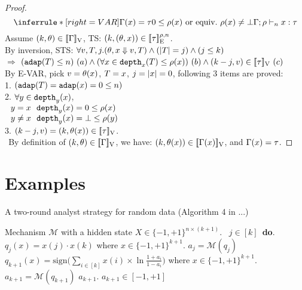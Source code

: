 \documentclass[a4paper,11pt]{article}
\theoremstyle{definition}
\begin{document}
\begin{proof}
\[    
	\inferrule*[right = VAR]{
      \Gamma(x) = \type \\ 0 \leq \dmap(x) \mbox{ or equiv.\ } \dmap(x) \neq \bot
    }{
      \Gamma; \dmap \tvdash{\nnatA} x: \type
    }
\]
Assume $(k, \theta) \in [\![ \Gamma ]\!]_{\text{V}}$, TS: $(k, (\theta, x)) \in [\![ \tau ]\!]_{\text{E}}^{\rho, n}$.\\
%
By inversion, STS: $\forall v, T, j. (\theta, x \mathrel{\Downarrow} v, T) \land (|T| = j) \land (j \leq k) $\\
$\Rightarrow$ 
$ (\mathtt{adap}(T) \leq n) ~ (a) 
\land (\forall x \in \mathtt{depth}_{x}(T) \leq \rho(x)) ~ (b)
\land (k - j, v) \in [\![ \tau ]\!]_{\text{V}} ~ (c)$\\
%
By E-VAR, pick $v = \theta(x)$, $T = x$, $j = |x| = 0$, following 3 items are proved:\\
%
1. $(\mathtt{adap}(T) = \mathtt{adap}(x) = 0 \leq n)$\\
2. $\forall y \in \mathtt{depth}_{y}(x)$, \\
$~~ y = x ~~ \mathtt{depth}_{y}(x) = 0 \leq \rho(x)$\\
$~~ y \neq x ~~ \mathtt{depth}_{y}(x) = \bot \leq \rho(y)$\\
3. $(k - j, v) = (k, \theta(x)) \in [\![ \tau ]\!]_{\text{V}}$.\\
$~~$By definition of $(k, \theta) \in [\![ \Gamma ]\!]_{\text{V}}$, we have: $(k, \theta(x))\in [\![ \Gamma(x) ]\!]_{\text{V}}$, and $\Gamma(x) = \tau$. 



\end{proof}

\clearpage

\section{Examples}

\begin{algorithm}
\caption{A two-round analyst strategy for random data (Algorithm 4 in ...)}
\label{alg:BitGOF}
\begin{algorithmic}
\REQUIRE Mechanism $\mathcal{M}$ with a hidden state $X\in \{-1,+1\}^{n\times (k+1)}$.
\ $j\in [k]$\ {\bf do}.  
\STATE {} $q_j(x)=x(j)\cdot x(k)$ where $x\in \{-1,+1\}^{k+1}$.
\STATE {} $a_j=\mathcal{M}(q_j)$ 
\STATE \qquad {}
 $q_{k+1}(x)=\mathrm{sign}\big (\sum_{i\in [k]} x(i)\times\ln\frac{1+a_i}{1-a_i} \big )$ where $x\in \{-1,+1\}^{k+1}$.
\STATE{}
 $a_{k+1}=\mathcal{M}(q_{k+1})$
\STATE{}
\RETURN $a_{k+1}$.
\ENSURE $a_{k+1}\in [-1,+1]$
\end{algorithmic}
\end{algorithm}
\end{document}
